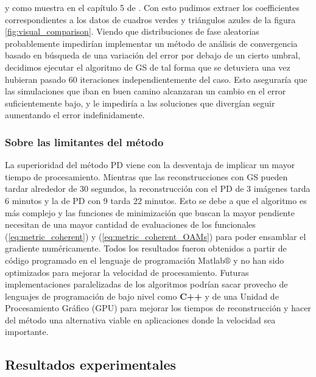 y como muestra en el capítulo 5 de . Con esto
pudimos extraer los coefficientes correspondientes a los datos de
cuadros verdes y triángulos azules de la figura
\ref{fig:visual_comparison}. 
Viendo que distribuciones de fase aleatorias probablemente impedirían
implementar un método de análisis de convergencia basado en búsqueda
de una variación del error por debajo de un cierto umbral, decidimos
ejecutar el algoritmo de GS de tal forma que se detuviera una vez
hubieran pasado 60 iteraciones independientemente del caso. Esto
aseguraría que las simulaciones que iban en buen camino alcanzaran un
cambio en el error suficientemente bajo, y le impediría a las
soluciones que divergían seguir aumentando el error indefinidamente. 

\subsubsection{Sobre las limitantes del método}
La superioridad del método PD viene con la desventaja de implicar un
mayor tiempo de procesamiento. Mientras que las reconstrucciones con
GS pueden tardar alrededor de 30 segundos, la reconstrucción con el PD
de 3 imágenes tarda 6 minutos y la de PD con 9 tarda 22 minutos. Esto
se debe a que el algoritmo es más complejo y las funciones de
minimización que buscan la mayor pendiente necesitan de una mayor cantidad
de evaluaciones de los funcionales (\ref{eq:metric_coherent}) y
(\ref{eq:metric_coherent_OAMs}) para poder ensamblar el gradiente
numéricamente. Todos los resultados fueron obtenidos a partir de
código programado en el lenguaje de programación Matlab$\circledR$ y
no han sido optimizados para mejorar la velocidad de
procesamiento. Futuras implementaciones paralelizadas de los
algoritmos podrían sacar provecho de lenguajes de programación de bajo
nivel como \textbf{C++} y de una Unidad de Procesamiento Gráfico (GPU)
para mejorar los tiempos de reconstrucción y hacer del método una
alternativa viable en aplicaciones donde la velocidad sea importante. 

\subsection{Resultados experimentales}
\label{sec:ChPD_resultados_experimentales}


\newpage
\pagebreak[4]

